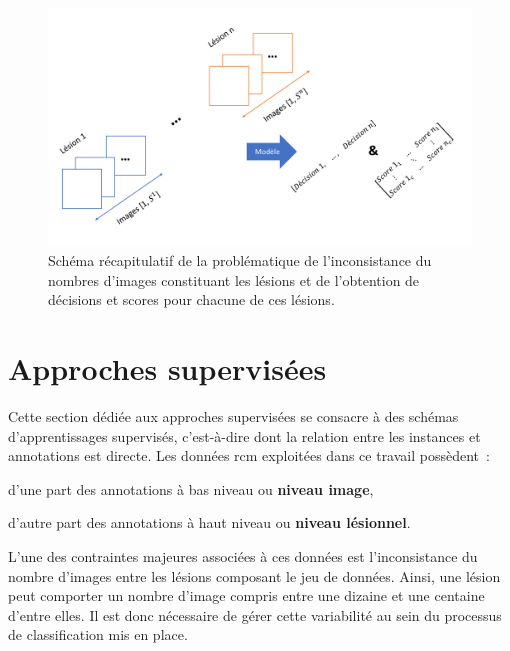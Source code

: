 \begin{figure}[H]
    \centering
    \includegraphics[width=0.65\linewidth]{contents/chapter_7/resources/scheme_patient_decision_objectives.pdf}
    \caption{Schéma récapitulatif de la problématique de l'inconsistance du nombres d'images constituant les lésions et de l'obtention de décisions et scores pour chacune de ces lésions.}
    \label{fig:scheme_patient_decision_objectives}
\end{figure}\par
\clearpage

\section{Approches supervisées}
\label{sec:patient_decision_supervised}
Cette section dédiée aux approches supervisées se consacre à des schémas d'apprentissages supervisés, c'est-à-dire dont la relation entre les instances et annotations est directe. Les données \gls{rcm} exploitées dans ce travail possèdent~:
\begin{inlinerate}
    \item d'une part des annotations à bas niveau ou \textbf{niveau image},
    \item d'autre part des annotations à haut niveau ou \textbf{niveau lésionnel}. 
\end{inlinerate} L'une des contraintes majeures associées à ces données est l'inconsistance du nombre d'images entre les lésions composant le jeu de données. Ainsi, une lésion peut comporter un nombre d'image compris entre une dizaine et une centaine d'entre elles. Il est donc nécessaire de gérer cette variabilité au sein du processus de classification mis en place.\par

